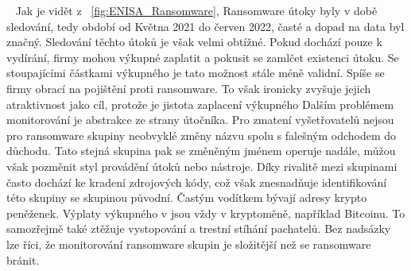 ~
Jak je vidět z ~\ref{fig:ENISA_Ransomware}, Ransomware útoky byly v době sledování, tedy období od Května 2021 do červen 2022, časté a dopad na data byl značný.
Sledování těchto útoků je však velmi obtížné.
Pokud dochází pouze k vydírání, firmy mohou výkupné zaplatit a pokusit se zamlčet existenci útoku.
Se stoupajícími částkami výkupného je tato možnost stále méně validní.
Spíše se firmy obrací na pojištění proti ransomware.
To však ironicky zvyšuje jejich atraktivnost jako cíl, protože je jistota zaplacení výkupného
Dalším problémem monitorování je abstrakce ze strany útočníka.
Pro zmatení vyšetřovatelů nejsou pro ransomware skupiny neobvyklé změny názvu spolu s falešným odchodem do důchodu.
Tato stejná skupina pak se změněným jménem operuje nadále, můžou však pozměnit styl provádění útoků nebo nástroje.
Díky rivalitě mezi skupinami často dochází ke kradení zdrojových kódy, což však znesnadňuje identifikování této skupiny se skupinou původní.
Častým vodítkem bývají adresy krypto peněženek.
Výplaty výkupného v jsou vždy v kryptoměně, například Bitcoinu.
To samozřejmě také ztěžuje vystopování a trestní stíhání pachatelů.
Bez nadsázky lze říci, že monitorování ransomware skupin je složitější než se ransomware bránit.\cite{Enisa_thread_landscape}

